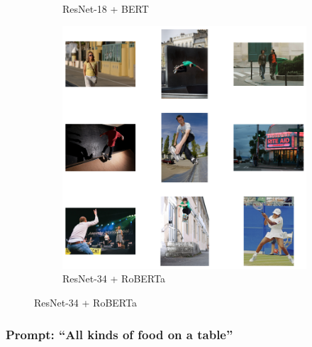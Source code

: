 \documentclass[11pt]{article}
\begin{document}
\begin{figure}[H]
\begin{subfigure}[b]{0.3\textwidth}
        \caption{\tiny ResNet-18 + BERT}
    \end{subfigure}
    \hfill
    \begin{subfigure}[b]{0.3\textwidth}
        \includegraphics[width=\linewidth]{Q2/A man skateboarding in the city/3.png}
        \caption{\tiny ResNet-34 + RoBERTa}
    \end{subfigure}
    
\end{figure}

\subsubsection{Prompt: ``All kinds of food on a table''}
\vspace{0.5em}
\end{document}
